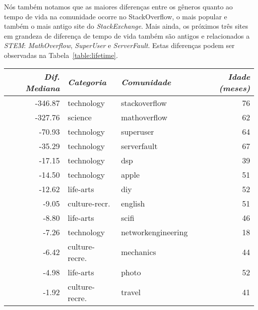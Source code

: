 Nós também notamos que as maiores diferenças entre os gêneros quanto ao tempo de vida na comunidade ocorre no StackOverflow, o mais popular e também o mais antigo site do \emph{StackExchange}. Mais ainda, os próximos três sites em grandeza de diferença de tempo de vida também são antigos e relacionados a \emph{STEM}: \emph{MathOverflow}, \emph{SuperUser} e \emph{ServerFault}. Estas diferenças podem ser observadas na Tabela~\ref{table:lifetime}. 

\begin{table}[!b]
\centering
\begin{tabular}{@{}rllr@{}}
\toprule
{\small\textit{Dif. Mediana}} & {\small \textit{Categoria}} & {\small \textit{Comunidade}} & {\small \textit{Idade (meses) }} \\ \midrule
-346.87                            & technology         & stackoverflow      & 76                 \\ \midrule
-327.76                           & science            & mathoverflow       & 62                 \\ \midrule
-70.93                            & technology         & superuser          & 64                 \\ \midrule
-35.29                            & technology         & serverfault        & 67                 \\ \midrule
-17.15                            & technology         & dsp                & 39                 \\ \midrule
-14.50                            & technology         & apple              & 51                 \\ \midrule
-12.62                            & life-arts          & diy                & 52                 \\ \midrule
-9.05                             & culture-recr. & english            & 51                 \\ \midrule
-8.80                             & life-arts          & scifi              & 46                 \\ \midrule
-7.26                             & technology         & networkengineering & 18                 \\ \midrule
-6.42                             & culture-recre. & mechanics          & 44                 \\ \midrule
-4.98                             & life-arts          & photo              & 52                 \\ \midrule
-1.92                             & culture-recre. & travel             & 41                 \\ \midrule

\end{tabular}
\end{table}
